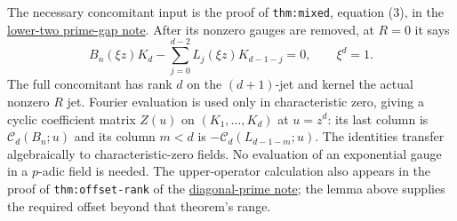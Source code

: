 \documentclass[11pt]{article}
\begin{document}
The necessary concomitant input is the proof of
\texttt{thm:mixed}, equation (3), in the
\href{LOWER_TWO_PRIME_GAP_SFC.tex}{lower-two prime-gap note}.
After its nonzero gauges are removed, at $R=0$ it says
\[
 B_n(\xi z)K_d-
 \sum_{j=0}^{d-2}L_j(\xi z)K_{d-1-j}=0,\qquad \xi^d=1. \tag{2}
\]
The full concomitant has rank $d$ on the $(d+1)$-jet and kernel
the actual nonzero $R$ jet. Fourier evaluation is used only in
characteristic zero, giving a cyclic coefficient matrix $Z(u)$
on $(K_1,\ldots,K_d)$ at $u=z^d$:
its last column is $\mathcal C_d(B_n;u)$ and its column $m<d$
is $-\mathcal C_d(L_{d-1-m};u)$.
The identities transfer algebraically to characteristic-zero fields.
No evaluation of an exponential gauge in a $p$-adic field is needed.
The upper-operator calculation also appears in the proof of
\texttt{thm:offset-rank} of the
\href{DIAGONAL_PRIME_GAP_SFC.tex}{diagonal-prime note};
the lemma above supplies the required offset beyond that theorem's range.
\end{document}
